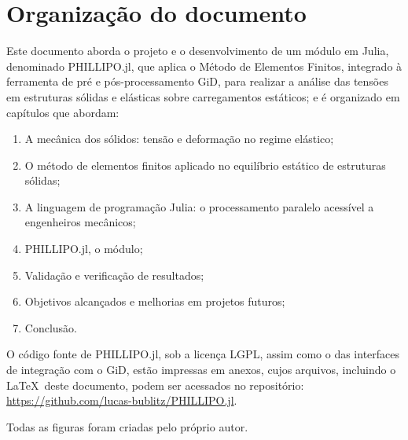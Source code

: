\section{Organização do documento}

Este documento aborda o projeto e o desenvolvimento de um módulo em Julia, denominado PHILLIPO.jl, que aplica o Método de Elementos Finitos, integrado à ferramenta de pré e pós-processamento GiD, para realizar a análise das tensões em estruturas sólidas e elásticas sobre carregamentos estáticos; e é organizado em capítulos que abordam:

\begin{enumerate}
    \item A mecânica dos sólidos: tensão e deformação no regime elástico;
    \item O método de elementos finitos aplicado no equilíbrio estático de estruturas sólidas;
    \item A linguagem de programação Julia: o processamento paralelo acessível a engenheiros mecânicos;
    \item PHILLIPO.jl, o módulo;
    \item Validação e verificação de resultados;
    \item Objetivos alcançados e melhorias em projetos futuros;
    \item Conclusão.
\end{enumerate}

O código fonte de PHILLIPO.jl, sob a licença LGPL, assim como o das interfaces de integração com o GiD, estão impressas em anexos, cujos arquivos, incluindo o \LaTeX\ deste documento, podem ser acessados no repositório: \url{https://github.com/lucas-bublitz/PHILLIPO.jl}.

Todas as figuras foram criadas pelo próprio autor.